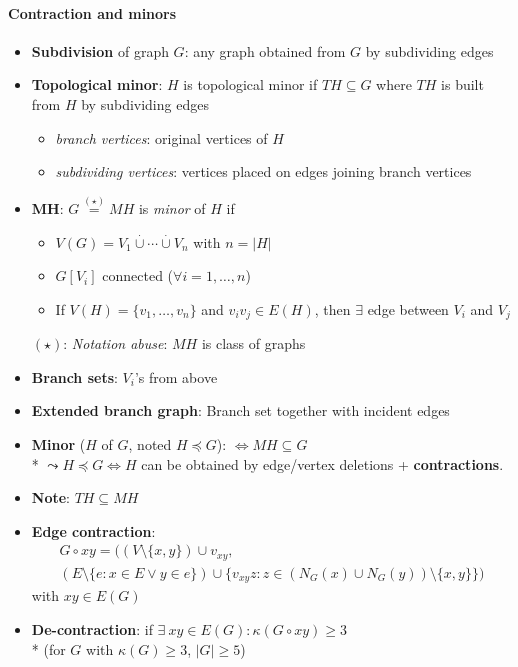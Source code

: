\paragraph{Contraction and minors}
\begin{itemize}
  \item \textbf{Subdivision} of graph $ G $: any graph obtained from $ G $ by subdividing edges
  \item \textbf{Topological minor}: $ H $ is topological minor if $ TH \subseteq G $ where $ TH $ is built from $ H $ by subdividing edges
  \begin{itemize}
    \item \emph{branch vertices}: original vertices of $ H $
    \item \emph{subdividing vertices}: vertices placed on edges joining branch vertices
  \end{itemize}
  \item \textbf{MH}: $ G \overset{(\star)}{=} MH $ is \emph{minor} of $ H $ if
  \begin{itemize}
    \item $ V(G) = V_1 \overset{\cdot}{\cup} \cdots \overset{\cdot}{\cup} V_n $ with $ n = \vert H \vert $
    \item $ G[V_i] $ connected ($ \forall i = 1, \dots, n $)
    \item If $ V(H) = \{ v_1, \dots, v_n \} $ and $ v_iv_j \in E(H) $, then $ \exists $ edge between $ V_i $ and $ V_j $
  \end{itemize}
  $ (\star) $: \emph{Notation abuse}: $ MH $ is class of graphs
  \item \textbf{Branch sets}: $ V_i $'s from above
  \item \textbf{Extended branch graph}: Branch set together with incident edges
  \item \textbf{Minor} ($ H $ of $ G $, noted $ H \preccurlyeq G $): $ \Leftrightarrow MH \subseteq G $ \\*
    $ \leadsto H \preccurlyeq G \Leftrightarrow H $ can be obtained by edge/vertex deletions + \textbf{contractions}.
  \item \textbf{Note}: $ TH \subseteq MH $
  \item \textbf{Edge contraction}:
  \begin{multline*}
    G \circ xy = ((V \setminus \{ x,y \}) \cup v_{xy}, \\
      (E \setminus \{ e: x \in E \vee y \in e \}) \cup \{ v_{xy}z : z \in (N_G(x) \cup N_G(y))\setminus \{ x,y \} \})
  \end{multline*}
  with $ xy \in E(G) $
  \item \textbf{De-contraction}: if $ \exists \ xy \in E(G) : \kappa(G \circ xy) \geq 3 $ \\*
    (for $ G $ with $ \kappa(G) \geq 3 $, $ \vert G \vert \geq 5 $) 
\end{itemize}

